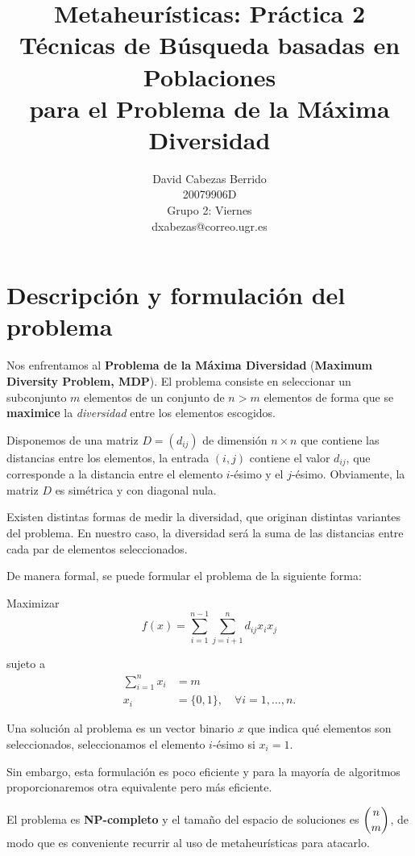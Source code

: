\documentclass{article}
\title{\Huge Metaheurísticas: Práctica 2 \\ Técnicas de Búsqueda basadas en Poblaciones \\ para el Problema de la Máxima Diversidad \vspace{10mm}}
\author{\huge David Cabezas Berrido \vspace{10mm} \\
	\huge 20079906D \vspace{10mm} \\  
  \huge Grupo 2: Viernes \vspace{10mm} \\ 
  \huge dxabezas@correo.ugr.es \vspace{10mm}}
\begin{document}
\maketitle
\newpage
\tableofcontents
\newpage

\section{Descripción y formulación del problema}

Nos enfrentamos al \textbf{Problema de la Máxima Diversidad} (\textbf{Maximum Diversity Problem, MDP}). El problema consiste en seleccionar
un subconjunto $m$ elementos de un conjunto de $n>m$ elementos de forma que se \textbf{maximice} la \emph{diversidad} entre los
 elementos escogidos.
 
 Disponemos de una matriz $D=(d_{ij})$ de dimensión $n\times n$ que contiene las distancias entre los elementos, la entrada $(i,j)$ contiene el
 valor $d_{ij}$, que corresponde a la distancia entre el elemento $i$-ésimo y el $j$-ésimo. Obviamente, la matriz $D$ es simétrica y con
 diagonal nula.
 
 Existen distintas formas de medir la diversidad, que originan distintas variantes del problema. En nuestro caso, la diversidad será la suma
 de las distancias entre cada par de elementos seleccionados.

De manera formal, se puede formular el problema de la siguiente forma:

\begin{description}
	\item Maximizar 
	\begin{equation} \label{eq:objetivo}
		f(x)=\sum_{i=1}^{n-1}\sum_{j=i+1}^n d_{ij} x_i x_j
	\end{equation}
	\item sujeto a 
	\begin{align*}
		\sum_{i=1}^n x_i &= m \\
		x_i&= \{0,1\}, \quad\forall i=1,\ldots, n.
	\end{align*}
\end{description}

Una solución al problema es un vector binario $x$ que indica qué elementos son seleccionados, seleccionamos el elemento $i$-ésimo si $x_i=1$.

Sin embargo, esta formulación es poco eficiente y para la mayoría de algoritmos proporcionaremos otra equivalente pero más eficiente.

El problema es \textbf{NP-completo} y el tamaño del espacio de soluciones es $\dbinom{n}{m}$, de modo que es conveniente recurrir al uso de metaheurísticas
para atacarlo.
\end{document}
